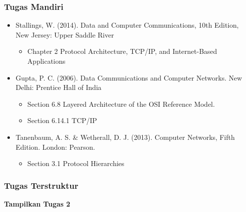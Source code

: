 \documentclass[pdflatex,compress]{beamer}
\begin{document}

\begin{frame}
	\frametitle{Tugas Mandiri}
	\begin{itemize}
		\item Stallings, W. (2014). Data and Computer Communications, 10th Edition, New Jersey: Upper Saddle River\\
		\begin{itemize}
			\item Chapter 2 Protocol Architecture, TCP/IP, and Internet-Based Applications
		\end{itemize}
		\item Gupta, P. C. (2006). Data Communications and Computer Networks. New Delhi: Prentice Hall of India\\
		\begin{itemize}
			\item Section 6.8 Layered Architecture of the OSI Reference Model.
			\item Section 6.14.1 TCP/IP
		\end{itemize}
		\item Tanenbaum, A. S. \& Wetherall, D. J. (2013). Computer Networks, Fifth Edition. London: Pearson.\\
		\begin{itemize}
			\item Section 3.1 Protocol Hierarchies
		\end{itemize}
	\end{itemize}
\end{frame}

\begin{frame}
	\frametitle{Tugas Terstruktur}
	\textbf{Tampilkan Tugas 2}
\end{frame}
\end{document}
